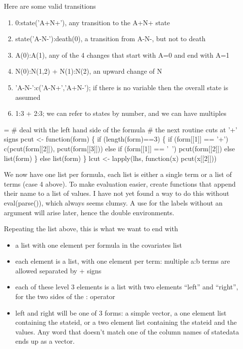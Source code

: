\documentclass{article}
\begin{document}
  Here are some valid transitions
\begin{enumerate}
   \item 0:state('A+N+'),   any transition to the A+N+ state
   \item state('A-N-'):death(0), a transition from A-N-, but not to death
   \item A(0):A(1), any of the 4 changes that start with A=0 and end with A=1
   \item N(0):N(1,2) + N(1):N(2), an upward change of N
   \item 'A-N-':c('A-N+','A+N-'); if there is no variable then the 
     overall state is assumed
   \item 1:3 + 2:3;  we can refer to states by number, and we can have multiples
\end{enumerate}

\begin{nwchunk}
=
 # deal with the left hand side of the formula
 # the next routine cuts at '+' signs
 pcut <- function(form) \{
     if (length(form)==3) \{
         if (form[[1]] == '+') 
             c(pcut(form[[2]]), pcut(form[[3]]))
         else if (form[[1]] == '~') pcut(form[[2]])
         else list(form)
     \}
     else list(form)
 \}
 lcut <- lapply(lhs, function(x) pcut(x[[2]]))
\end{nwchunk}
We now have one list per formula, each list is either a single term
or a list of terms (case 4 above).
To make evaluation easier, create functions that append their
name to a list of values.
I have not yet found a way to do this without eval(parse()), which
always seems clumsy.
A use for the labels without an argument will arise later, hence the
double environments.

Repeating the list above, this is what we want to end with
\begin{itemize}
  \item a list with one element per formula in the covariates list
  \item each element is a list, with one element per term: multiple
    a:b terms are allowed separated by + signs
  \item each of these level 3 elements is a list with two elements
    ``left'' and ``right'', for the two sides of the : operator
  \item left and right will be one of 3 forms: a simple vector,
    a one element list containing the stateid, or a two element list
    containing the stateid and the values.  
    Any word that doesn't match one of the
    column names of statedata ends up as a vector.
\end{itemize}
\end{document}
